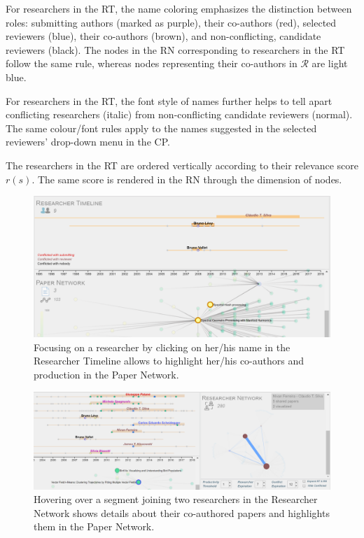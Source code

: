 For researchers in the RT, the name coloring emphasizes the distinction between roles: submitting authors (marked as purple), their co-authors (red), selected reviewers (blue), their co-authors (brown), and non-conflicting, candidate reviewers (black). The nodes in the RN corresponding to researchers in the RT follow the same rule, whereas nodes representing their co-authors in $\mathcal{R}$ are light blue.   

For researchers in the RT, the font style of names further helps to tell apart conflicting researchers (italic) from non-conflicting candidate reviewers (normal). The same colour/font rules apply to the names suggested in the selected reviewers' drop-down menu in the CP.

The researchers in the RT are ordered vertically according to their relevance score $r(s)$. The same score is rendered in the RN through the dimension of nodes.  \\


\begin{figure}
\centering
\includegraphics[width=\textwidth]{images/co-authors.png}
\caption{Focusing on a researcher by clicking on her/his name in the Researcher Timeline allows to highlight her/his co-authors and production in the Paper Network.}
\label{fig:co-authors}
\end{figure}

\begin{figure}
\centering
\includegraphics[width=\textwidth]{images/researchernetwork.png}
\caption{Hovering over a segment joining two researchers in the Researcher Network shows details about their co-authored papers and highlights them in the Paper Network.}
\label{fig:researchernetwork}
\end{figure}

